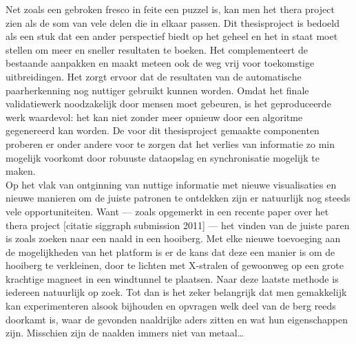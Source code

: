 Net zoals een gebroken fresco in feite een puzzel is, kan men het thera project zien als de som van vele delen die in elkaar passen. Dit thesisproject is bedoeld als een stuk dat een ander perspectief biedt op het geheel en het in staat moet stellen om meer en sneller resultaten te boeken. Het complementeert de bestaande aanpakken en maakt meteen ook de weg vrij voor toekomstige uitbreidingen. Het zorgt ervoor dat de resultaten van de automatische paarherkenning nog nuttiger gebruikt kunnen worden. Omdat het finale validatiewerk noodzakelijk door mensen moet gebeuren, is het geproduceerde werk waardevol: het kan niet zonder meer opnieuw door een algoritme gegenereerd kan worden. De voor dit thesisproject gemaakte componenten proberen er onder andere voor te zorgen dat het verlies van informatie zo min mogelijk voorkomt door robuuste dataopslag en synchronisatie mogelijk te maken.\\

Op het vlak van ontginning van nuttige informatie met nieuwe visualisaties en nieuwe manieren om de juiste patronen te ontdekken zijn er natuurlijk nog steeds vele opportuniteiten. Want --- zoals opgemerkt in een recente paper over het thera project [citatie siggraph submission 2011] --- het vinden van de juiste paren is zoals zoeken naar een naald in een hooiberg. Met elke nieuwe toevoeging aan de mogelijkheden van het platform is er de kans dat deze een manier is om de hooiberg te verkleinen, door te lichten met X-stralen of gewoonweg op een grote krachtige magneet in een windtunnel te plaatsen. Naar deze laatste methode is iedereen natuurlijk op zoek. Tot dan is het zeker belangrijk dat men gemakkelijk kan experimenteren alsook bijhouden en opvragen welk deel van de berg reeds doorkamt is, waar de gevonden naaldrijke aders zitten en wat hun eigenschappen zijn. Misschien zijn de naalden immers niet van metaal\ldots